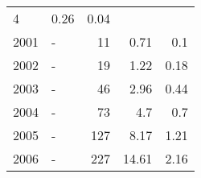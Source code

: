 \begin{longtable}{lXrrr}
       \num{4} &
       \num[round-mode=places,round-precision=2]{0.26} &
         \num[round-mode=places,round-precision=2]{0.04} \\

     2001 &
     \multicolumn{1}{X}{ -  } &


       \num{11} &
       \num[round-mode=places,round-precision=2]{0.71} &
         \num[round-mode=places,round-precision=2]{0.1} \\

     2002 &
     \multicolumn{1}{X}{ -  } &


       \num{19} &
       \num[round-mode=places,round-precision=2]{1.22} &
         \num[round-mode=places,round-precision=2]{0.18} \\

     2003 &
     \multicolumn{1}{X}{ -  } &


       \num{46} &
       \num[round-mode=places,round-precision=2]{2.96} &
         \num[round-mode=places,round-precision=2]{0.44} \\

     2004 &
     \multicolumn{1}{X}{ -  } &


       \num{73} &
       \num[round-mode=places,round-precision=2]{4.7} &
         \num[round-mode=places,round-precision=2]{0.7} \\

     2005 &
     \multicolumn{1}{X}{ -  } &


       \num{127} &
       \num[round-mode=places,round-precision=2]{8.17} &
         \num[round-mode=places,round-precision=2]{1.21} \\

     2006 &
     \multicolumn{1}{X}{ -  } &


       \num{227} &
       \num[round-mode=places,round-precision=2]{14.61} &
         \num[round-mode=places,round-precision=2]{2.16} \\


\end{longtable}

